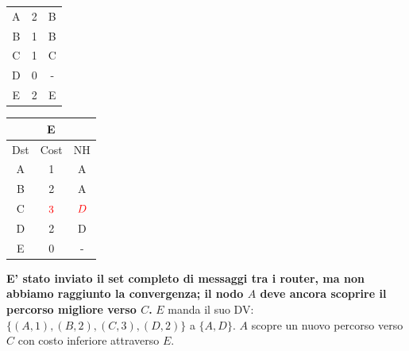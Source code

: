 \documentclass[10pt]{article}
\begin{document}
\begin{table}[h!]
\begin{tabular}{|c||c||c|}
					\hline
					A & 2 & B \\
					B & 1 & B \\
					C & 1 & C \\
					D & 0 & - \\
					E & 2 & E \\
					\hline
				\end{tabular}
				\begin{tabular}{|c||c||c|}
					\hline
					\multicolumn{3}{|c|}{E} \\
					\hline
					Dst & Cost & NH\\
					\hline
					A & 1 & A \\
					B & 2 & A \\
					C & $\color{red} 3$ & $\color{red} D$ \\
					D & 2 & D \\
					E & 0 & - \\
					\hline
				\end{tabular}
			\end{table}
			\newline \newline
			\textbf{E' stato inviato il set completo di messaggi tra i router, ma non abbiamo raggiunto la convergenza; il nodo $A$ deve ancora scoprire il percorso migliore verso $C$.}
			\newline \newline \newline
			$E$ manda il suo DV: $\{(A,1),(B,2),(C,3),(D,2)\}$ a $\{A,D\}$.
			\newline
			$A$ scopre un nuovo percorso verso $C$ con costo inferiore attraverso $E$.
\end{document}
